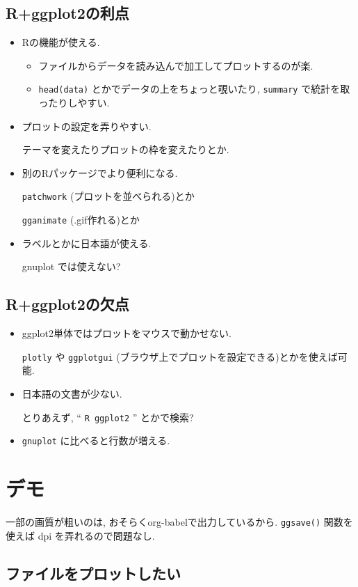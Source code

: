 \documentclass[lualatex,a4paper,12pt,report,ja=standard]{bxjsarticle}
\begin{document}
\subsection{R+ggplot2の利点}
\label{sec:org5ce786a}
\begin{itemize}
\item Rの機能が使える.
\begin{itemize}
\item ファイルからデータを読み込んで加工してプロットするのが楽.
\item \texttt{head(data)} とかでデータの上をちょっと覗いたり,
\texttt{summary} で統計を取ったりしやすい.
\end{itemize}
\item プロットの設定を弄りやすい.

テーマを変えたりプロットの枠を変えたりとか.
\item 別のRパッケージでより便利になる.

\texttt{patchwork} (プロットを並べられる)とか

\texttt{gganimate} (.gif作れる)とか
\item ラベルとかに日本語が使える.

gnuplot では使えない?
\end{itemize}
\subsection{R+ggplot2の欠点}
\label{sec:org25e9a35}
\begin{itemize}
\item ggplot2単体ではプロットをマウスで動かせない.

\texttt{plotly} や  \texttt{ggplotgui} (ブラウザ上でプロットを設定できる)とかを使えば可能.
\item 日本語の文書が少ない.

とりあえず, `` \texttt{R ggplot2} '' とかで検索?
\item \texttt{gnuplot} に比べると行数が増える.
\end{itemize}
\section{デモ}
\label{sec:org5e4fc7a}
一部の画質が粗いのは, おそらくorg-babelで出力しているから.
\texttt{ggsave()} 関数を使えば dpi を弄れるので問題なし.
\subsection{ファイルをプロットしたい}
\label{sec:orgc824ce9}
\end{document}
